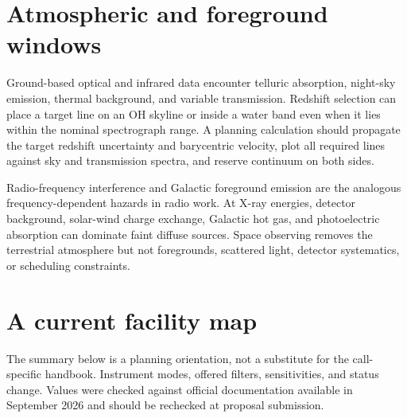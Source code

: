\section{Atmospheric and foreground windows}

Ground-based optical and infrared data encounter telluric absorption,
night-sky emission, thermal background, and variable transmission. Redshift
selection can place a target line on an OH skyline or inside a water band even
when it lies within the nominal spectrograph range. A planning calculation
should propagate the target redshift uncertainty and barycentric velocity,
plot all required lines against sky and transmission spectra, and reserve
continuum on both sides.

Radio-frequency interference and Galactic foreground emission are the
analogous frequency-dependent hazards in radio work. At X-ray energies,
detector background, solar-wind charge exchange, Galactic hot gas, and
photoelectric absorption can dominate faint diffuse sources. Space observing
removes the terrestrial atmosphere but not foregrounds, scattered light,
detector systematics, or scheduling constraints.

\section{A current facility map}

The summary below is a planning orientation, not a substitute for the
call-specific handbook. Instrument modes, offered filters, sensitivities, and
status change. Values were checked against official documentation available
in September 2026 and should be rechecked at proposal submission.

